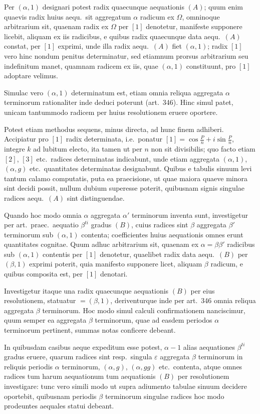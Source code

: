 \documentclass[12pt,a4paper]{article}
\theoremstyle{plain}
\theoremstyle{definition}
\theoremstyle{remark}
\begin{document}
Per $(\alpha,1)$ designari potest radix quaecunque aequationis $(A)$; quum enim quaevis radix huius aequ.\ sit aggregatum $\alpha$ radicum ex $\Omega$, omninoque arbitrarium sit, quaenam radix ex $\Omega$ per $[1]$ denotetur, manifeste supponere licebit, aliquam ex iis radicibus, e quibus radix quaecunque data aequ.\ $(A)$ constat, per $[1]$ exprimi, unde illa radix aequ.\ $(A)$ fiet $(\alpha,1)$; radix $[1]$ vero hinc nondum penitus determinatur, sed etiamnum prorsus arbitrarium seu indefinitum manet, quamnam radicem ex iis, quae $(\alpha,1)$ constituunt, pro $[1]$ adoptare velimus.

Simulac vero $(\alpha,1)$ determinatum est, etiam omnia reliqua aggregata $\alpha$ terminorum rationaliter inde deduci poterunt (art.\ 346). Hinc simul patet, unicam tantummodo radicem per huius resolutionem eruere oportere.

Potest etiam methodus sequens, minus directa, ad hunc finem adhiberi. Accipiatur pro $[1]$ radix determinata, i.e.\ ponatur $[1]=\cos\frac{P}{n}+i\sin\frac{P}{n}$, integre $k$ ad lubitum electo, ita tamen ut per $n$ non sit divisibilis; quo facto etiam $[2]$, $[3]$ etc.\ radices determinatas indicabunt, unde etiam aggregata $(\alpha,1)$, $(\alpha,g)$ etc.\ quantitates determinatas designabunt. Quibus e tabulis sinuum levi tantum calamo computatis, puta ea praecisione, ut quae maiora quaeve minora sint decidi possit, nullum dubium superesse poterit, quibusnam signis singulae radices aequ.\ $(A)$ sint distinguendae.

Quando hoc modo omnia $\alpha$ aggregata $\alpha'$ terminorum inventa sunt, investigetur per art.\ praec.\ aequatio $\beta^{ti}$ gradus $(B)$, cuius radices sint $\beta$ aggregata $\beta'$ terminorum sub $(\alpha,1)$ contenta; coefficientes huius aequationis omnes erunt quantitates cognitae. Quum adhuc arbitrarium sit, quaenam ex $\alpha=\beta\beta'$ radicibus sub $(\alpha,1)$ contentis per $[1]$ denotetur, quaelibet radix data aequ.\ $(B)$ per $(\beta,1)$ exprimi poterit, quia manifesto supponere licet, aliquam $\beta$ radicum, e quibus composita est, per $[1]$ denotari.

Investigetur itaque una radix quaecunque aequationis $(B)$ per eius resolutionem, statuatur $=(\beta,1)$, deriventurque inde per art.\ 346 omnia reliqua aggregata $\beta$ terminorum. Hoc modo simul calculi confirmationem nanciscimur, quum semper ea aggregata $\beta$ terminorum, quae ad easdem periodos $\alpha$ terminorum pertinent, summas notas conficere debeant.

In quibusdam casibus aeque expeditum esse potest, $\alpha-1$ alias aequationes $\beta^{ti}$ gradus eruere, quarum radices sint resp.\ singula $\varepsilon$ aggregata $\beta$ terminorum in reliquis periodis $\alpha$ terminorum, $(\alpha,g)$, $(\alpha,gg)$ etc.\ contenta, atque omnes radices tum harum aequationum tum aequationis $(B)$ per resolutionem investigare: tunc vero simili modo ut supra adiumento tabulae sinuum decidere oportebit, quibusnam periodis $\beta$ terminorum singulae radices hoc modo prodeuntes aequales statui debeant.
\end{document}
